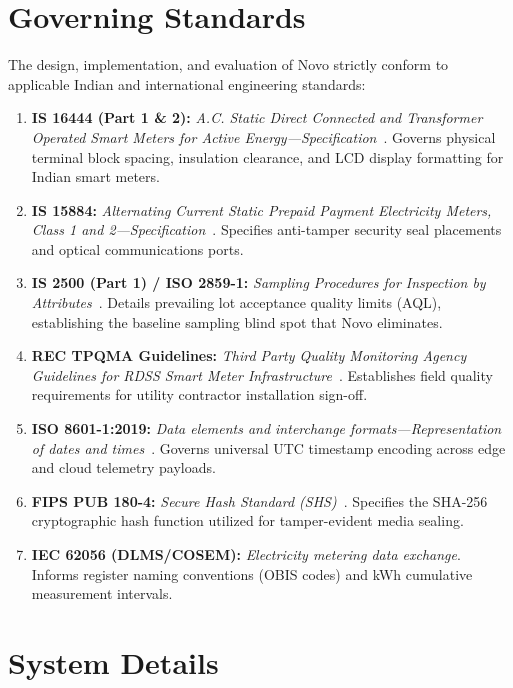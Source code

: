 \documentclass[12pt,a4paper,oneside]{report}
\begin{document}
\section{Governing Standards}
The design, implementation, and evaluation of Novo strictly conform to applicable Indian and international engineering standards:
\begin{enumerate}
    \item \textbf{IS 16444 (Part 1 \& 2):} \textit{A.C. Static Direct Connected and Transformer Operated Smart Meters for Active Energy---Specification}~\cite{bis16444}. Governs physical terminal block spacing, insulation clearance, and LCD display formatting for Indian smart meters.
    \item \textbf{IS 15884:} \textit{Alternating Current Static Prepaid Payment Electricity Meters, Class 1 and 2---Specification}~\cite{bis15884}. Specifies anti-tamper security seal placements and optical communications ports.
    \item \textbf{IS 2500 (Part 1) / ISO 2859-1:} \textit{Sampling Procedures for Inspection by Attributes}~\cite{bis2500}. Details prevailing lot acceptance quality limits (AQL), establishing the baseline sampling blind spot that Novo eliminates.
    \item \textbf{REC TPQMA Guidelines:} \textit{Third Party Quality Monitoring Agency Guidelines for RDSS Smart Meter Infrastructure}~\cite{cea2021rdss}. Establishes field quality requirements for utility contractor installation sign-off.
    \item \textbf{ISO 8601-1:2019:} \textit{Data elements and interchange formats---Representation of dates and times}~\cite{iso8601}. Governs universal UTC timestamp encoding across edge and cloud telemetry payloads.
    \item \textbf{FIPS PUB 180-4:} \textit{Secure Hash Standard (SHS)}~\cite{fips180}. Specifies the SHA-256 cryptographic hash function utilized for tamper-evident media sealing.
    \item \textbf{IEC 62056 (DLMS/COSEM):} \textit{Electricity metering data exchange}. Informs register naming conventions (OBIS codes) and kWh cumulative measurement intervals.
\end{enumerate}

\section{System Details}
\end{document}
